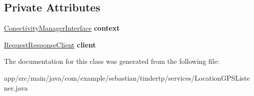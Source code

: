 \subsection*{Private Attributes}
\begin{DoxyCompactItemize}
\item 
\hyperlink{interfacecom_1_1example_1_1sebastian_1_1tindertp_1_1ConectivityManagerInterface}{Conectivity\+Manager\+Interface} {\bfseries context}\hypertarget{classcom_1_1example_1_1sebastian_1_1tindertp_1_1services_1_1LocationGPSListener_ae8dc549b33e7d1f111d3f601f1931c14}{}\label{classcom_1_1example_1_1sebastian_1_1tindertp_1_1services_1_1LocationGPSListener_ae8dc549b33e7d1f111d3f601f1931c14}

\item 
\hyperlink{classcom_1_1example_1_1sebastian_1_1tindertp_1_1internetTools_1_1RequestResponseClient}{Request\+Response\+Client} {\bfseries client}\hypertarget{classcom_1_1example_1_1sebastian_1_1tindertp_1_1services_1_1LocationGPSListener_a891a4d088af3687a153941ee77672f6e}{}\label{classcom_1_1example_1_1sebastian_1_1tindertp_1_1services_1_1LocationGPSListener_a891a4d088af3687a153941ee77672f6e}

\end{DoxyCompactItemize}


The documentation for this class was generated from the following file\+:\begin{DoxyCompactItemize}
\item 
app/src/main/java/com/example/sebastian/tindertp/services/Location\+G\+P\+S\+Listener.\+java\end{DoxyCompactItemize}
